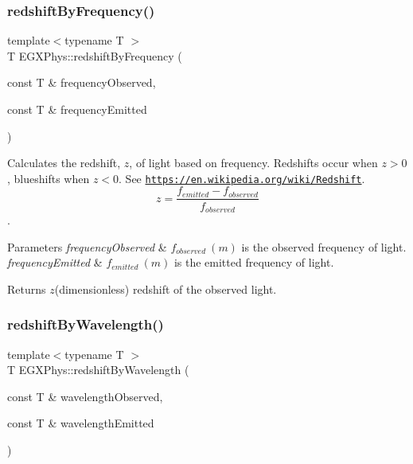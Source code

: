 \subsubsection{\texorpdfstring{redshift\+By\+Frequency()}{redshiftByFrequency()}}
{\footnotesize\ttfamily template$<$typename T $>$ \\
T E\+G\+X\+Phys\+::redshift\+By\+Frequency (\begin{DoxyParamCaption}\item[{const T \&}]{frequency\+Observed,  }\item[{const T \&}]{frequency\+Emitted }\end{DoxyParamCaption})}



Calculates the redshift, $z$, of light based on frequency. Redshifts occur when $z > 0$, blueshifts when $z < 0$. See \href{https://en.wikipedia.org/wiki/Redshift}{\tt https\+://en.\+wikipedia.\+org/wiki/\+Redshift}. \[z=\frac{f_{emitted}-f_{observed}}{f_{observed}}\]. 


\begin{DoxyParams}{Parameters}
{\em frequency\+Observed} & $f_{observed}\ (m)$ is the observed frequency of light. \\
\hline
{\em frequency\+Emitted} & $f_{emitted}\ (m)$ is the emitted frequency of light. \\
\hline
\end{DoxyParams}
\begin{DoxyReturn}{Returns}
$z$(dimensionless) redshift of the observed light. 
\end{DoxyReturn}
\mbox{\label{group___e_g_x_phys-_redshift_ga29300a13e34da35332ca2d447b5ce82d}} 
\subsubsection{\texorpdfstring{redshift\+By\+Wavelength()}{redshiftByWavelength()}}
{\footnotesize\ttfamily template$<$typename T $>$ \\
T E\+G\+X\+Phys\+::redshift\+By\+Wavelength (\begin{DoxyParamCaption}\item[{const T \&}]{wavelength\+Observed,  }\item[{const T \&}]{wavelength\+Emitted }\end{DoxyParamCaption})}



